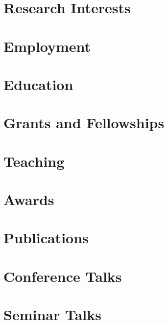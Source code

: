 \documentclass[11pt]{article}
\begin{document}


\section*{Research Interests}


\section*{Employment}


\section*{Education}


\section*{Grants and Fellowships}


\section*{Teaching}


\section*{Awards}


\newpage

\section*{Publications}


\section*{Conference Talks}


\section*{Seminar Talks}


% 
\end{document}
